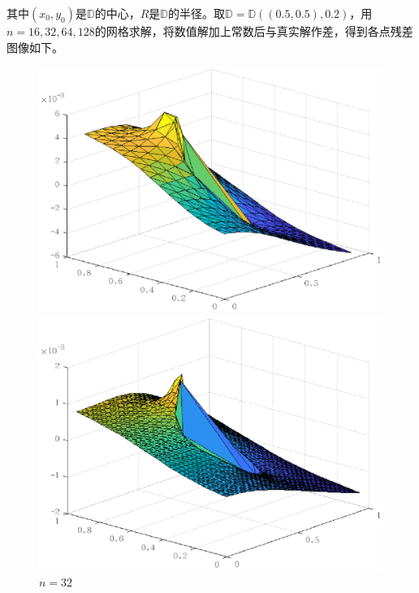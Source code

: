\documentclass[lang=cn,11pt,a4paper]{elegantpaper}
\begin{document}
其中$(x_0,y_0)$是$\mathbb{D}$的中心，$R$是$\mathbb{D}$的半径。取$\mathbb{D}=\mathbb{D}((0.5,0.5),0.2)$，用$n=16,32,64,128$的网格求解，将数值解加上常数后与真实解作差，得到各点残差图像如下。

\begin{figure}[htbp]
  \centering
  \begin{minipage}[t]{0.24\linewidth}
      \centering
      \includegraphics[width=0.95\linewidth]{figure/error_problem1_N_ir_n=16.eps}
      \caption*{$n=16$}
  \end{minipage}
  \begin{minipage}[t]{0.24\linewidth}
    \centering
    \includegraphics[width=0.95\linewidth]{figure/error_problem1_N_ir_n=32.eps}
    \caption*{$n=32$}
  \end{minipage}
  \begin{minipage}[t]{0.24\linewidth}

\end{minipage}
\end{figure}
\end{document}
